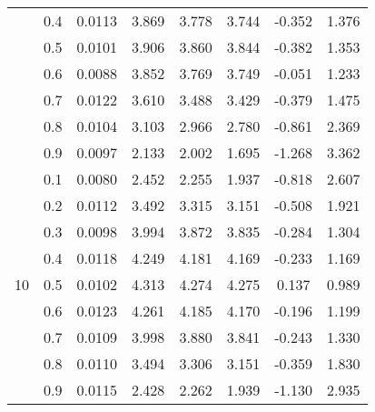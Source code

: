 \documentclass[11pt,a4paper]{report}
\begin{document}
\begin{longtable}{ | c | c || c | c | c | c | c | c | }
 & 0.4 & 0.0113 & 3.869 & 3.778 & 3.744 & -0.352 & 1.376 \\
 & 0.5 & 0.0101 & 3.906 & 3.860 & 3.844 & -0.382 & 1.353 \\
 & 0.6 & 0.0088 & 3.852 & 3.769 & 3.749 & -0.051 & 1.233 \\
 & 0.7 & 0.0122 & 3.610 & 3.488 & 3.429 & -0.379 & 1.475 \\
 & 0.8 & 0.0104 & 3.103 & 2.966 & 2.780 & -0.861 & 2.369 \\
 & 0.9 & 0.0097 & 2.133 & 2.002 & 1.695 & -1.268 & 3.362 \\
 \hline
\multirow{9}{*}{10} & 0.1 & 0.0080 & 2.452 & 2.255 & 1.937 & -0.818 & 2.607 \\
 & 0.2 & 0.0112 & 3.492 & 3.315 & 3.151 & -0.508 & 1.921 \\
 & 0.3 & 0.0098 & 3.994 & 3.872 & 3.835 & -0.284 & 1.304 \\
 & 0.4 & 0.0118 & 4.249 & 4.181 & 4.169 & -0.233 & 1.169 \\
 & 0.5 & 0.0102 & 4.313 & 4.274 & 4.275 & 0.137 & 0.989 \\
 & 0.6 & 0.0123 & 4.261 & 4.185 & 4.170 & -0.196 & 1.199 \\
 & 0.7 & 0.0109 & 3.998 & 3.880 & 3.841 & -0.243 & 1.330 \\
 & 0.8 & 0.0110 & 3.494 & 3.306 & 3.151 & -0.359 & 1.830 \\
 & 0.9 & 0.0115 & 2.428 & 2.262 & 1.939 & -1.130 & 2.935 \\
 \hline
\hline
\end{longtable}
\end{document}
